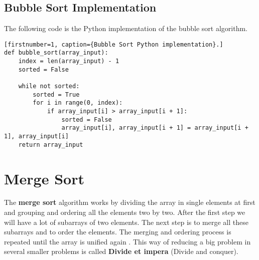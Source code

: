 \subsection{Bubble Sort Implementation}
The following code is the Python implementation of the bubble sort algorithm.
\begin{lstlisting}[firstnumber=1, caption={Bubble Sort Python implementation}.]
def bubble_sort(array_input):
	index = len(array_input) - 1
	sorted = False
	
	while not sorted:
		sorted = True
		for i in range(0, index):
			if array_input[i] > array_input[i + 1]:
				sorted = False
				array_input[i], array_input[i + 1] = array_input[i + 1], array_input[i]
	return array_input
\end{lstlisting}

\section{Merge Sort}
The \textbf{merge sort} algorithm works by dividing the array in single elements at first and grouping and ordering all the elements two by two. After the first step we will have a lot of subarrays of two elements. The next step is to merge all these subarrays and to order the elements. The merging and ordering process is repeated until the array is unified again \cite{wikimergesort}. This way of reducing a big problem in several smaller problems is called \textbf{Divide et impera} (Divide and conquer).

